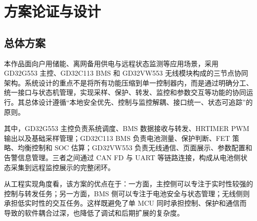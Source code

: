 

\section{方案论证与设计}

\subsection{总体方案}

本作品面向户用储能、离网备用供电与远程状态监测等应用场景，采用 GD32G553 主控、GD32C113 BMS 和 GD32VW553 无线模块构成的三节点协同架构。系统设计的重点不是将所有功能压缩到单一控制器内，而是通过明确分工、统一接口与状态机管理，实现采样、保护、转发、监控和参数交互等功能的协同运行。其总体设计遵循“本地安全优先、控制与监控解耦、接口统一、状态可追踪”的原则。

其中，GD32G553 主控负责系统调度、BMS 数据接收与转发、HRTIMER PWM 输出以及基础采样管理；GD32C113 BMS 负责电池测量、保护判断、FET 策略、均衡控制和 SOC 估算；GD32VW553 负责无线通信、页面展示、参数配置和告警信息管理。三者之间通过 CAN FD 与 UART 等链路连接，构成从电池侧状态采集到远程监控展示的完整闭环。

从工程实现角度看，该方案的优点在于：一方面，主控侧可以专注于实时性较强的控制与转发任务；另一方面，BMS 侧可以专注于电池安全与状态管理；无线侧则承担低实时性的交互任务。这样既避免了单 MCU 同时承担控制、保护和通信而导致的软件耦合过深，也降低了调试和后期扩展的复杂度。

